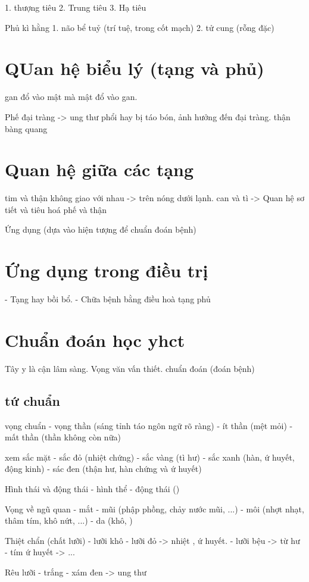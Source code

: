 1. thượng tiêu
2. Trung tiêu
3. Hạ tiêu

Phủ kì hằng
1. não bể tuỷ (trí tuệ, trong cốt mạch)
2. tử cung (rỗng đặc)

\section{QUan hệ biểu lý (tạng và phủ)}
gan đổ vào mật mà mật đổ vào gan.

Phế đại tràng -> ung thư phổi hay bị táo bón, ảnh hưởng đến đại tràng.
thận bàng quang 

\section{Quan hệ giữa các tạng}
tim và thận không giao với nhau -> trên nóng dưới lạnh.
can và tì -> Quan hệ sơ tiết và tiêu hoá
phế và thận

Ứng dụng (dựa vào hiện tượng để chuẩn đoán bệnh)

\section{Ứng dụng trong điều trị}
- Tạng hay bồi bổ.
- Chữa bệnh bằng điều hoà tạng phủ

\section{Chuẩn đoán học yhct}
Tây y là cận lâm sàng.
Vọng văn vấn thiết.
chuẩn
đoán (đoán bệnh)

\subsection{tứ chuẩn}
vọng chuẩn
- vọng thần (sáng tỉnh táo ngôn ngữ rõ ràng)
- ít thần (mệt mỏi)
- mất thần (thần không còn nữa)

xem sắc mặt
- sắc đỏ (nhiệt chứng)
- sắc vàng (tì hư)
- sắc xanh (hàn, ứ huyết, động kinh)
- sác đen (thận hư, hàn chứng và ứ huyết)

Hình thái và động thái
- hình thể  
- động thái ()

Vọng về ngũ quan
- mắt
- mũi (phập phồng, chảy nước mũi, ...)
- môi (nhợt nhạt, thâm tím, khô nứt, ...)
- da (khô, )

Thiệt chẩn (chất lưỡi)
- lưỡi khô 
- lưỡi đỏ -> nhiệt , ứ huyết.
- lưỡi bệu -> từ hư
- tím ứ huyết -> ...

Rêu lưỡi
- trắng 
- xám đen -> ung thư

